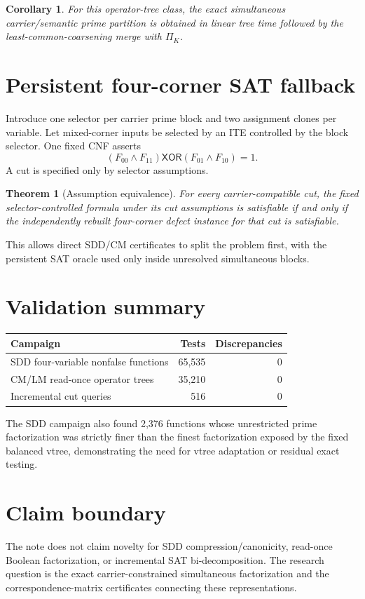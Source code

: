 \documentclass[11pt]{article}
\newtheorem{theorem}{Theorem}
\newtheorem{corollary}{Corollary}
\begin{document}
\begin{corollary}
For this operator-tree class, the exact simultaneous carrier/semantic prime partition is obtained in linear tree time followed by the least-common-coarsening merge with $\Pi_K$.
\end{corollary}

\section{Persistent four-corner SAT fallback}
Introduce one selector per carrier prime block and two assignment clones per variable.  Let mixed-corner inputs be selected by an ITE controlled by the block selector.  One fixed CNF asserts
\[
(F_{00}\land F_{11})\mathbin{\mathsf{XOR}}(F_{01}\land F_{10})=1.
\]
A cut is specified only by selector assumptions.

\begin{theorem}[Assumption equivalence]
For every carrier-compatible cut, the fixed selector-controlled formula under its cut assumptions is satisfiable if and only if the independently rebuilt four-corner defect instance for that cut is satisfiable.
\end{theorem}

This allows direct SDD/CM certificates to split the problem first, with the persistent SAT oracle used only inside unresolved simultaneous blocks.

\section{Validation summary}
\begin{center}
\begin{tabular}{lrr}
\toprule
Campaign & Tests & Discrepancies\\
\midrule
SDD four-variable nonfalse functions & 65,535 & 0\\
CM/LM read-once operator trees & 35,210 & 0\\
Incremental cut queries & 516 & 0\\
\bottomrule
\end{tabular}
\end{center}

The SDD campaign also found 2,376 functions whose unrestricted prime factorization was strictly finer than the finest factorization exposed by the fixed balanced vtree, demonstrating the need for vtree adaptation or residual exact testing.

\section{Claim boundary}
The note does not claim novelty for SDD compression/canonicity, read-once Boolean factorization, or incremental SAT bi-decomposition.  The research question is the exact carrier-constrained simultaneous factorization and the correspondence-matrix certificates connecting these representations.
\end{document}
